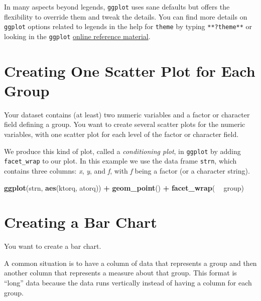 \documentclass[
]{book}
\newenvironment{Shaded}{\begin{snugshade}}{\end{snugshade}}
\newcommand{\KeywordTok}[1]{\textcolor[rgb]{0.13,0.29,0.53}{\textbf{#1}}}
\newcommand{\NormalTok}[1]{#1}
\newcommand{\OperatorTok}[1]{\textcolor[rgb]{0.81,0.36,0.00}{\textbf{#1}}}
\newcommand{\StringTok}[1]{\textcolor[rgb]{0.31,0.60,0.02}{#1}}
\begin{document}
In many aspects beyond legends, \texttt{ggplot} uses sane defaults but offers the flexibility to override them and tweak the details. You can find more details on \texttt{ggplot} options related to legends in the help for \texttt{theme} by typing \texttt{**?theme**} or looking in the \texttt{ggplot} \href{http://ggplot2.tidyverse.org/reference/theme.html}{online reference material}.

\hypertarget{creating-one-scatter-plot-for-each-group}{%
\section{Creating One Scatter Plot for Each Group}\label{creating-one-scatter-plot-for-each-group}}

Your dataset contains (at least) two numeric variables and a factor or character field defining a group. You want to create several scatter plots for the numeric variables, with one
scatter plot for each level of the factor or character field.

We produce this kind of plot, called a \emph{conditioning plot}, in \texttt{ggplot} by adding \texttt{facet\_wrap} to our plot.
In this example we use the data frame \texttt{strn}, which contains three columns: \emph{x}, \emph{y}, and \emph{f}, with \emph{f} being a factor (or a character string).

\begin{Shaded}
\begin{Highlighting}[]
\KeywordTok{ggplot}\NormalTok{(strn, }\KeywordTok{aes}\NormalTok{(ktorq, atorq)) }\OperatorTok{+}
\StringTok{  }\KeywordTok{geom_point}\NormalTok{() }\OperatorTok{+}
\StringTok{  }\KeywordTok{facet_wrap}\NormalTok{( }\OperatorTok{~}\StringTok{ }\NormalTok{group)}
\end{Highlighting}
\end{Shaded}

\hypertarget{creating-a-bar-chart}{%
\section{Creating a Bar Chart}\label{creating-a-bar-chart}}

You want to create a bar chart.

A common situation is to have a column of data that represents a group and then another column that represents a measure about that group. This format is ``long'' data because the data runs vertically instead of having a column for each group.
\end{document}
